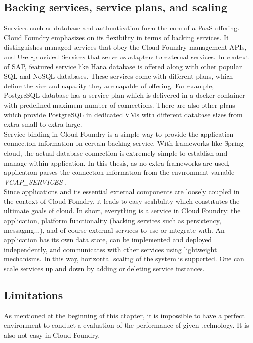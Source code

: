 \subsection{ Backing services, service plans, and scaling}
Services such as database and authentication form the core of a \ac{PaaS} offering. Cloud Foundry emphasizes on its flexibility in terms of backing services. It distinguishes managed services that obey the Cloud Foundry management APIs, and User-provided Services that serve as adapters to external services. In context of SAP, featured service like Hana database is offered along with other popular SQL and NoSQL databases. These services come with different plans, which define the size and capacity they are capable of offering. For example, PostgreSQL database has a service plan which is delivered in a docker container with predefined maximum number of connections. There are also other plans which provide PostgreSQL in dedicated VMs with different database sizes from extra small to extra large. \\
Service binding in Cloud Foundry is a simple way to provide the application connection information on certain backing service. With frameworks like Spring cloud, the actual database connection is extremely simple to establish and manage within application. In this thesis, as no extra frameworks are used, application parses the connection information from the environment variable \textit{VCAP\_SERVICES} . \\
Since applications and its essential external components are loosely coupled in the context of Cloud Foundry, it leads to easy scalibility which constitutes the ultimate goals of cloud.  In short, everything is a service in Cloud Foundry: the application, platform functionality (backing services such as persistency, messaging...), and of course external services to use or integrate with. An application has its own data store, can be implemented and deployed independently, and communicates with other services using lightweight mechanisms.  In this way, horizontal scaling of the system is supported. One can scale services up and down by adding or deleting service instances.

\subsection{Limitations}
As mentioned at the beginning of this chapter, it is impossible to have a perfect environment to conduct a evaluation of the performance of given technology. It is also not easy in Cloud Foundry. \\
